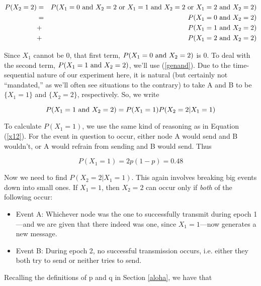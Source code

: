 \begin{eqnarray}
\label{x2}
P(X_2 = 2) 
&=& P(X_1 = 0 {\rm ~and~} X_2 = 2 \textrm{ or }
X_1 = 1 {\rm ~and~} X_2 = 2 \textrm{ or }
X_1 = 2 {\rm ~and~} X_2 = 2) \nonumber \\
&=& P(X_1 = 0 {\rm ~and~} X_2 = 2)  \\
&+& P(X_1 = 1 {\rm ~and~} X_2 = 2) \nonumber \\
&+& P(X_1 = 2 {\rm ~and~} X_2 = 2) \nonumber 
\end{eqnarray}

Since $X_1$ cannot be 0, that first term, $P(X_1 = 0 {\rm ~and~} X_2 =
2)$ is 0.  To deal with the second term, $P(X_1 = 1 {\rm ~and~} X_2 =
2)$, we'll use (\ref{genand}).  Due to the time-sequential nature of our
experiment here, it is natural (but certainly not ``mandated,'' as we'll
often see situations to the contrary) to take A and B to be $\{X_1 =
1\}$ and $\{X_2 = 2\}$, respectively.  So, we write

\begin{equation}
\label{x1x2}
P(X_1 = 1 {\rm ~and~} X_2 = 2) = P(X_1 = 1) P(X_2 = 2 | X_1 = 1)
\end{equation}

To calculate $P(X_1 = 1)$, we use the same kind of reasoning as in
Equation (\ref{x12}).  For the event in question to occur, either node A
would send and B wouldn't, or A would refrain from sending and B would
send.  Thus

\begin{equation}
\label{px11}
P(X_1 = 1) = 2p(1-p) = 0.48
\end{equation}

Now we need to find $P(X_2 = 2 | X_1 = 1)$.  This again involves
breaking big events down into small ones.  If $X_1 = 1$, then $X_2 = 2$
can occur only if {\it both} of the following occur:

\begin{itemize}

\item Event A:  Whichever node was the one to successfully transmit
during epoch 1---and we are given that there indeed was one, since $X_1
= 1$---now generates a new message.

\item Event B:  During epoch 2, no successful transmission occurs, i.e.
either they both try to send or neither tries to send.

\end{itemize}

Recalling the definitions of p and q in Section \ref{aloha},  
we have that

